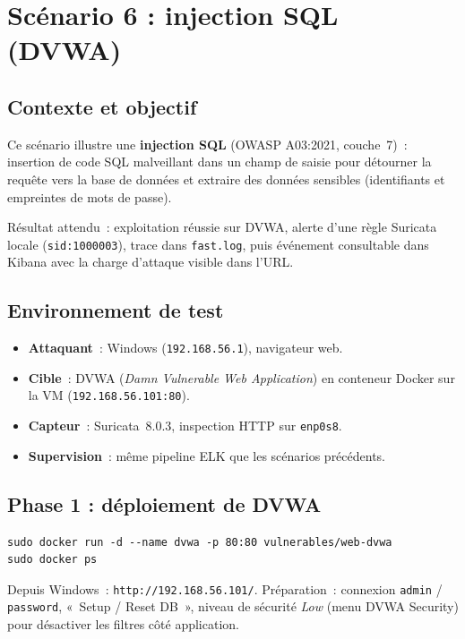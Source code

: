 \documentclass[12pt]{article}
\begin{document}
\section{Scénario 6 : injection SQL (DVWA)}\label{sec:Q7}

\subsection{Contexte et objectif}

Ce scénario illustre une \textbf{injection SQL} (OWASP A03:2021, couche~7)~:
insertion de code SQL malveillant dans un champ de saisie pour détourner la
requête vers la base de données et extraire des données sensibles (identifiants
et empreintes de mots de passe).

Résultat attendu~: exploitation réussie sur DVWA, alerte d'une règle Suricata
locale (\texttt{sid:1000003}), trace dans \texttt{fast.log}, puis événement
consultable dans Kibana avec la charge d'attaque visible dans l'URL.

\subsection{Environnement de test}

\begin{itemize}[nosep]
  \item \textbf{Attaquant}~: Windows (\texttt{192.168.56.1}), navigateur web.
  \item \textbf{Cible}~: DVWA (\textit{Damn Vulnerable Web Application}) en
        conteneur Docker sur la VM (\texttt{192.168.56.101:80}).
  \item \textbf{Capteur}~: Suricata~8.0.3, inspection HTTP sur \texttt{enp0s8}.
  \item \textbf{Supervision}~: même pipeline ELK que les scénarios précédents.
\end{itemize}

\subsection{Phase 1 : déploiement de DVWA}

\begin{verbatim}
sudo docker run -d --name dvwa -p 80:80 vulnerables/web-dvwa
sudo docker ps
\end{verbatim}

Depuis Windows~: \texttt{http://192.168.56.101/}. Préparation~: connexion
\texttt{admin} / \texttt{password}, «~Setup / Reset DB~», niveau de sécurité
\textit{Low} (menu DVWA Security) pour désactiver les filtres côté application.
\end{document}
